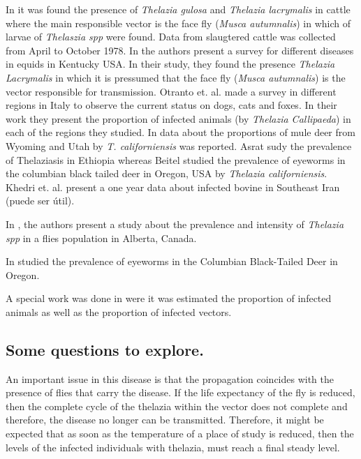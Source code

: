 \documentclass[preprint,12pt]{elsarticle}
\begin{document}
\noindent In \cite{Moolenbeek:1980} it was found the presence of \textit{Thelazia gulosa} and \textit{Thelazia lacrymalis} in cattle where the main responsible vector is the face fly (\textit{Musca autumnalis}) in which of larvae of \textit{Thelaszia spp} were found. Data from slaugtered cattle was collected from April to October
1978. In \cite{Lyons:2000} the authors present a survey for different diseases in equids in Kentucky USA. In their study, they found the presence \textit{Thelazia Lacrymalis} in which it is pressumed that the face fly (\textit{Musca autumnalis}) is the vector responsible for transmission. Otranto et. al. \cite{Otranto:2003} made a survey in different regions in Italy to observe the current status on dogs, cats and foxes. In their work they present the proportion of infected animals (by \textit{Thelazia Callipaeda}) in each of the regions they studied. In \cite{Dubay:2000} data about the proportions of mule deer from Wyoming and Utah by \textit{T. californiensis} was reported. Asrat \cite{Asrat:2016} sudy the prevalence of Thelaziasis in Ethiopia whereas Beitel \cite{Beitel:1974} studied the prevalence of eyeworms in the columbian black tailed deer in Oregon, USA by \textit{Thelazia californiensis}. Khedri et. al. \cite{Khedri:2016} present a one year data about infected bovine in Southeast Iran (puede ser útil).

\noindent In \cite{Ohara:1989}, the authors present a study about the prevalence and intensity of \textit{Thelazia spp} in a flies population in Alberta, Canada.


In \cite{Beitel:1974} studied the prevalence of eyeworms in the Columbian Black-Tailed Deer in Oregon. 

A special work was done in \cite{Moolenbeek:1980} were it was estimated the proportion of infected animals as well as the proportion of infected vectors.

\subsection{Some questions to explore.}
\noindent An important issue in this disease is that the propagation coincides with the presence of flies that carry the disease. If the life expectancy of the fly is reduced, then
the complete cycle of the thelazia within the vector does not complete and therefore, the 
disease no longer can be transmitted. Therefore, it might be expected that as soon as the temperature of a place of study is reduced, then the levels of the infected individuals 
with thelazia, must reach a final steady level.
\end{document}
